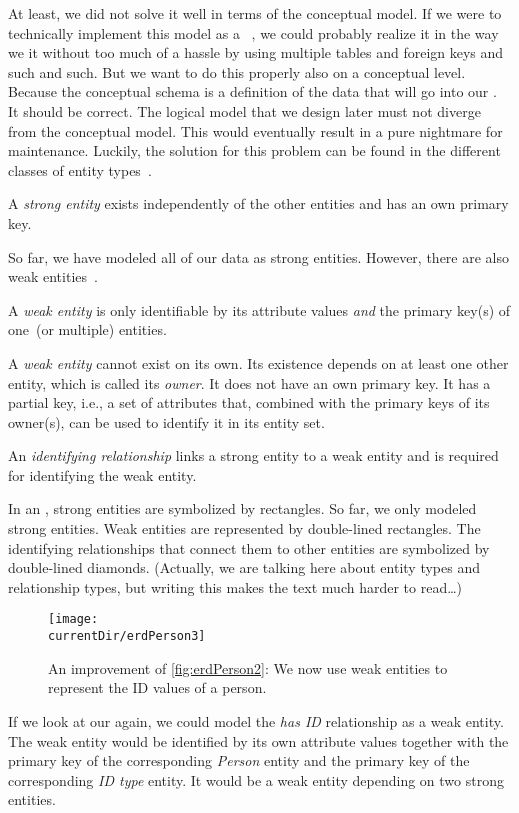 At least, we did not solve it well in terms of the conceptual model.
If we were to technically implement this model as a \postgresql\ \db, we could probably realize it in the way we  it without too much of a hassle by using multiple tables and foreign keys and such and such.
But we want to do this properly also on a conceptual level.
Because the conceptual schema is a definition of the data that will go into our \db.
It should be correct.
The logical model that we design later must not diverge from the conceptual model.
This would eventually result in a pure nightmare for maintenance.
Luckily, the solution for this problem can be found in the different classes of entity types~\cite{S2024D:CDMERDE}.%
%
\begin{definition}%
A \emph{strong entity} exists independently of the other entities and has an own primary key.%
\end{definition}%
%
So far, we have modeled all of our data as strong entities.
However, there are also weak entities~\cite{P2006CITRD:CERDTRM,SS2005EIDDDFDB:CDDICAMP,S2024D:CDMERDE}.%
%
\begin{definition}%
A \emph{weak entity} is only identifiable by its attribute values \emph{and} the primary key(s) of one~(or multiple) entities.%
\end{definition}%
%
A \emph{weak entity} cannot exist on its own.
Its existence depends on at least one other entity, which is called its \emph{owner}.
It does not have an own primary key.
It has a partial key, i.e., a set of attributes that, combined with the primary keys of its owner(s), can be used to identify it in its entity set.%
%
\begin{definition}%
\label{def:identiRelation}%
An \emph{identifying relationship} links a strong entity to a weak entity and is required for identifying the weak entity.%
\end{definition}%
%
In an , strong entities are symbolized by rectangles.
So far, we only modeled strong entities.
Weak entities are represented by double-lined rectangles.
The identifying relationships that connect them to other entities are symbolized by double-lined diamonds.
(Actually, we are talking here about entity types and relationship types, but writing this makes the text much harder to read\dots)

\begin{figure}%
\centering%
\texttt{[image: \\currentDir/erdPerson3]}%
\caption{An improvement of \cref{fig:erdPerson2}: We now use weak entities to represent the ID values of a person.}%
\label{fig:erdPerson3}%
\end{figure}%
%
If we look at our  again, we could model the \emph{has ID} relationship as a weak entity.
The weak entity would be identified by its own attribute values together with the primary key of the corresponding \emph{Person} entity and the primary key of the corresponding \emph{ID type} entity.
It would be a weak entity depending on two strong entities.

